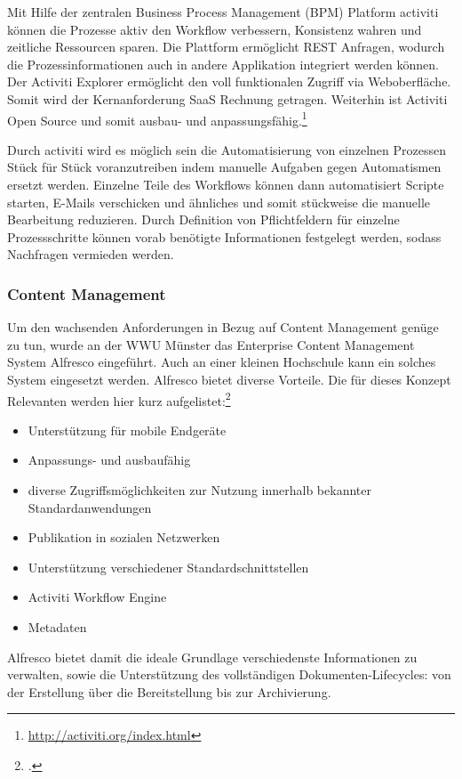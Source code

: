 Mit Hilfe der zentralen Business Process Management (BPM) Platform activiti können die Prozesse aktiv den Workflow verbessern, Konsistenz wahren und zeitliche Ressourcen sparen.  Die Plattform ermöglicht REST Anfragen, wodurch die Prozessinformationen auch in andere Applikation integriert werden können. Der Activiti Explorer ermöglicht den voll funktionalen Zugriff via Weboberfläche. Somit wird der Kernanforderung SaaS Rechnung getragen. Weiterhin ist Activiti Open Source und somit ausbau- und anpassungsfähig.\footnote{\url{http://activiti.org/index.html}}

Durch activiti wird es möglich sein die Automatisierung von einzelnen Prozessen Stück für Stück voranzutreiben indem manuelle Aufgaben gegen Automatismen ersetzt werden. Einzelne Teile des Workflows können dann automatisiert Scripte starten, E-Mails verschicken und ähnliches und somit stückweise die manuelle Bearbeitung reduzieren. Durch Definition von Pflichtfeldern für einzelne Prozessschritte können vorab benötigte Informationen festgelegt werden, sodass Nachfragen vermieden werden.

\subsubsection{Content Management}
Um den wachsenden Anforderungen in Bezug auf Content Management genüge zu tun, wurde an der WWU Münster das Enterprise Content Management System Alfresco eingeführt. Auch an einer kleinen Hochschule kann ein solches System eingesetzt werden. Alfresco bietet diverse Vorteile. Die für dieses Konzept Relevanten werden hier kurz aufgelistet:\footcite[Vgl.][47 ff.]{kloetgen_2012}

\begin{itemize}
	\item Unterstützung für mobile Endgeräte
	\item Anpassungs- und ausbaufähig
	\item diverse Zugriffsmöglichkeiten zur Nutzung innerhalb bekannter Standardanwendungen
	\item Publikation in sozialen Netzwerken
	\item Unterstützung verschiedener Standardschnittstellen
	\item Activiti Workflow Engine
	\item Metadaten
\end{itemize}

Alfresco bietet damit die ideale Grundlage verschiedenste Informationen zu verwalten, sowie die Unterstützung des vollständigen Dokumenten-Lifecycles: von der Erstellung über die Bereitstellung bis zur Archivierung.

